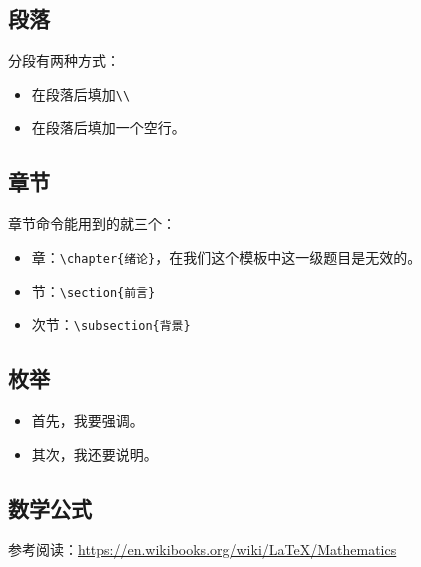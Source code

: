\subsection{段落}

分段有两种方式：
\begin{itemize}
\item 在段落后填加\verb!\\!
\item 在段落后填加一个空行。
\end{itemize}

\subsection{章节}

章节命令能用到的就三个：
\begin{itemize}
\item 章：\verb!\chapter{绪论}!，在我们这个模板中这一级题目是无效的。
\item 节：\verb!\section{前言}!
\item 次节：\verb!\subsection{背景}!
\end{itemize}

\subsection{枚举}

\begin{codeout}
  \begin{itemize}
  \item 首先，我要强调。
  \item 其次，我还要说明。
  \end{itemize}
\end{codeout}

\subsection{数学公式}

参考阅读：\url{https://en.wikibooks.org/wiki/LaTeX/Mathematics}

